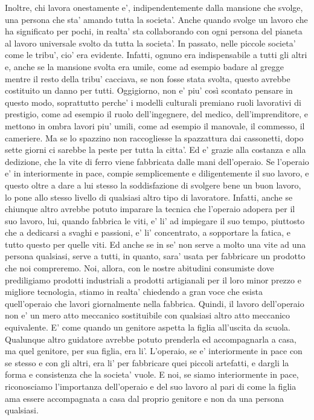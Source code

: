 Inoltre, chi lavora onestamente e', indipendentemente dalla mansione che svolge, una persona che sta' amando tutta la societa'. Anche quando svolge un lavoro che ha significato per pochi, in realta' sta collaborando con ogni persona del pianeta al lavoro universale svolto da tutta la societa'. 
In passato, nelle piccole societa' come le tribu', cio' era evidente. Infatti, ognuno era indispensabile a tutti gli altri e, anche se la mansione svolta era umile, come ad esempio badare al gregge mentre il resto della tribu' cacciava,  se non fosse stata svolta, questo avrebbe costituito un danno per tutti.
Oggigiorno, non e' piu' così scontato pensare in questo modo, soprattutto perche' i modelli culturali premiano ruoli lavorativi di prestigio, come ad esempio il ruolo dell'ingegnere, del medico, dell'imprenditore, e mettono in ombra lavori piu' umili, come ad esempio il manovale, il commesso, il cameriere. 
Ma se lo spazzino non raccogliesse la spazzattura dai cassonetti, dopo sette giorni ci sarebbe la peste per tutta la citta'. Ed e' grazie alla costanza e alla dedizione, che la vite di ferro viene fabbricata dalle mani dell'operaio. Se l'operaio e' in interiormente in pace, compie semplicemente e diligentemente il suo lavoro, e questo oltre a dare a lui stesso la soddisfazione di svolgere bene un buon lavoro, lo pone allo stesso livello di qualsiasi altro tipo di lavoratore. 
Infatti, anche se chiunque altro avrebbe potuto imparare la tecnica che l'operaio adopera per il suo lavoro, lui, quando fabbrica le viti, e' li' ad impiegare il suo tempo, piuttosto che a dedicarsi a svaghi e passioni, e' li' concentrato, a sopportare la fatica, e tutto questo per quelle viti. 
Ed anche se in se' non serve a molto una vite ad una persona qualsiasi, serve a tutti, in quanto, sara' usata per fabbricare un prodotto che noi compreremo. 
Noi, allora, con le nostre abitudini consumiste dove prediligiamo prodotti industriali a prodotti artigianali per il loro minor prezzo e migliore tecnologia, stiamo in realta' chiedendo a gran voce che esista quell'operaio che lavori giornalmente nella fabbrica.
Quindi, il lavoro dell'operaio non e' un mero atto meccanico sostituibile con qualsiasi altro atto meccanico equivalente. E' come quando un genitore aspetta la figlia all'uscita da scuola. Qualunque altro guidatore avrebbe potuto prenderla ed accompagnarla a casa, ma quel genitore, per sua figlia, era li'. 
L'operaio, se e' interiormente in pace con se stesso e con gli altri, era li' per fabbricare quei piccoli artefatti, e dargli la forma e consistenza che la societa' vuole. E noi, se siamo interiormente in pace, riconosciamo l'importanza dell'operaio e del suo lavoro al pari di come la figlia ama essere accompagnata a casa dal proprio genitore e non da una persona qualsiasi.

